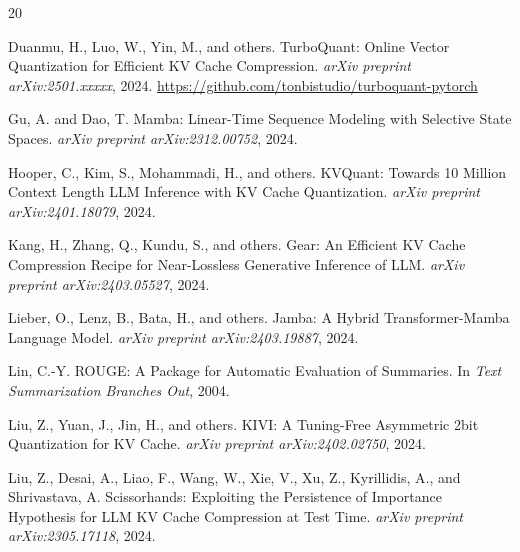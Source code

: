\documentclass[11pt]{article}
\begin{document}
\begingroup
\renewcommand{\section}[2]{}
\begin{thebibliography}{20}

Duanmu, H., Luo, W., Yin, M., and others.
\newblock TurboQuant: Online Vector Quantization for Efficient KV Cache Compression.
\newblock \emph{arXiv preprint arXiv:2501.xxxxx}, 2024.
\newblock \url{https://github.com/tonbistudio/turboquant-pytorch}

Gu, A. and Dao, T.
\newblock Mamba: Linear-Time Sequence Modeling with Selective State Spaces.
\newblock \emph{arXiv preprint arXiv:2312.00752}, 2024.

Hooper, C., Kim, S., Mohammadi, H., and others.
\newblock KVQuant: Towards 10 Million Context Length LLM Inference with KV Cache Quantization.
\newblock \emph{arXiv preprint arXiv:2401.18079}, 2024.

Kang, H., Zhang, Q., Kundu, S., and others.
\newblock Gear: An Efficient KV Cache Compression Recipe for Near-Lossless Generative Inference of LLM.
\newblock \emph{arXiv preprint arXiv:2403.05527}, 2024.

Lieber, O., Lenz, B., Bata, H., and others.
\newblock Jamba: A Hybrid Transformer-Mamba Language Model.
\newblock \emph{arXiv preprint arXiv:2403.19887}, 2024.

Lin, C.-Y.
\newblock ROUGE: A Package for Automatic Evaluation of Summaries.
\newblock In \emph{Text Summarization Branches Out}, 2004.

Liu, Z., Yuan, J., Jin, H., and others.
\newblock KIVI: A Tuning-Free Asymmetric 2bit Quantization for KV Cache.
\newblock \emph{arXiv preprint arXiv:2402.02750}, 2024.

Liu, Z., Desai, A., Liao, F., Wang, W., Xie, V., Xu, Z., Kyrillidis, A., and Shrivastava, A.
\newblock Scissorhands: Exploiting the Persistence of Importance Hypothesis for LLM KV Cache Compression at Test Time.
\newblock \emph{arXiv preprint arXiv:2305.17118}, 2024.


\end{thebibliography}
\end{document}
